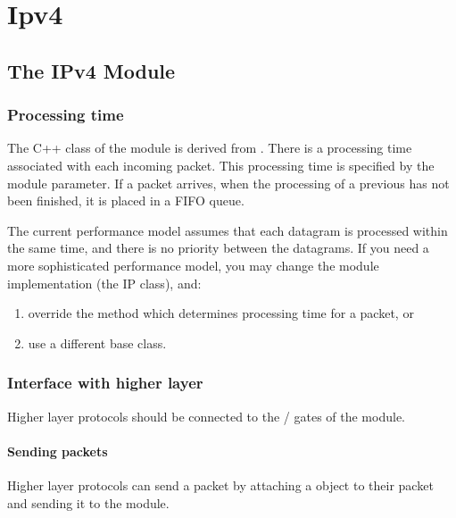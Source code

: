 \chapter{Ipv4}
\label{cha:ipv4}

\section{The IPv4 Module}

\subsection{Processing time}

The C++ class of the  module is derived from .
There is a processing time associated with each incoming packet.
This processing time is specified by the  module parameter.
If a packet arrives, when the processing of a previous has not been
finished, it is placed in a FIFO queue.

The current performance model assumes that each datagram is processed
within the same time, and there is no priority between the datagrams.
If you need a more sophisticated performance model, you may change
the module implementation (the IP class), and:
\begin{enumerate}
  \item override the  method which determines processing
        time for a packet, or
  \item use a different base class.
\end{enumerate}

\subsection{Interface with higher layer}

Higher layer protocols should be connected to the /
gates of the  module.

\subsubsection*{Sending packets}

Higher layer protocols can send a packet by attaching a 
object to their packet and sending it to the  module.


